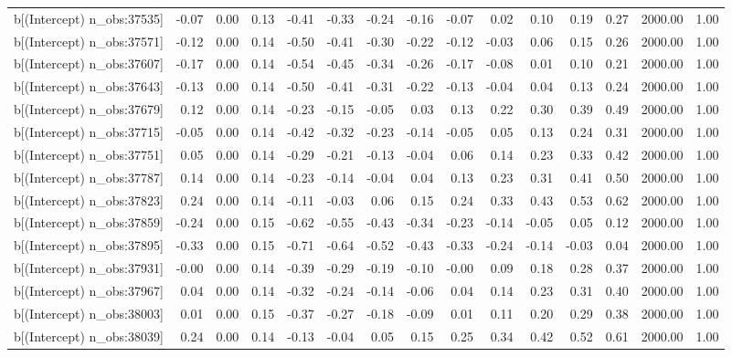 \begin{table}[ht]
\begin{tabular}{rrrrrrrrrrrrrrr}
  b[(Intercept) n\_obs:37535] & -0.07 & 0.00 & 0.13 & -0.41 & -0.33 & -0.24 & -0.16 & -0.07 & 0.02 & 0.10 & 0.19 & 0.27 & 2000.00 & 1.00 \\ 
  b[(Intercept) n\_obs:37571] & -0.12 & 0.00 & 0.14 & -0.50 & -0.41 & -0.30 & -0.22 & -0.12 & -0.03 & 0.06 & 0.15 & 0.26 & 2000.00 & 1.00 \\ 
  b[(Intercept) n\_obs:37607] & -0.17 & 0.00 & 0.14 & -0.54 & -0.45 & -0.34 & -0.26 & -0.17 & -0.08 & 0.01 & 0.10 & 0.21 & 2000.00 & 1.00 \\ 
  b[(Intercept) n\_obs:37643] & -0.13 & 0.00 & 0.14 & -0.50 & -0.41 & -0.31 & -0.22 & -0.13 & -0.04 & 0.04 & 0.13 & 0.24 & 2000.00 & 1.00 \\ 
  b[(Intercept) n\_obs:37679] & 0.12 & 0.00 & 0.14 & -0.23 & -0.15 & -0.05 & 0.03 & 0.13 & 0.22 & 0.30 & 0.39 & 0.49 & 2000.00 & 1.00 \\ 
  b[(Intercept) n\_obs:37715] & -0.05 & 0.00 & 0.14 & -0.42 & -0.32 & -0.23 & -0.14 & -0.05 & 0.05 & 0.13 & 0.24 & 0.31 & 2000.00 & 1.00 \\ 
  b[(Intercept) n\_obs:37751] & 0.05 & 0.00 & 0.14 & -0.29 & -0.21 & -0.13 & -0.04 & 0.06 & 0.14 & 0.23 & 0.33 & 0.42 & 2000.00 & 1.00 \\ 
  b[(Intercept) n\_obs:37787] & 0.14 & 0.00 & 0.14 & -0.23 & -0.14 & -0.04 & 0.04 & 0.13 & 0.23 & 0.31 & 0.41 & 0.50 & 2000.00 & 1.00 \\ 
  b[(Intercept) n\_obs:37823] & 0.24 & 0.00 & 0.14 & -0.11 & -0.03 & 0.06 & 0.15 & 0.24 & 0.33 & 0.43 & 0.53 & 0.62 & 2000.00 & 1.00 \\ 
  b[(Intercept) n\_obs:37859] & -0.24 & 0.00 & 0.15 & -0.62 & -0.55 & -0.43 & -0.34 & -0.23 & -0.14 & -0.05 & 0.05 & 0.12 & 2000.00 & 1.00 \\ 
  b[(Intercept) n\_obs:37895] & -0.33 & 0.00 & 0.15 & -0.71 & -0.64 & -0.52 & -0.43 & -0.33 & -0.24 & -0.14 & -0.03 & 0.04 & 2000.00 & 1.00 \\ 
  b[(Intercept) n\_obs:37931] & -0.00 & 0.00 & 0.14 & -0.39 & -0.29 & -0.19 & -0.10 & -0.00 & 0.09 & 0.18 & 0.28 & 0.37 & 2000.00 & 1.00 \\ 
  b[(Intercept) n\_obs:37967] & 0.04 & 0.00 & 0.14 & -0.32 & -0.24 & -0.14 & -0.06 & 0.04 & 0.14 & 0.23 & 0.31 & 0.40 & 2000.00 & 1.00 \\ 
  b[(Intercept) n\_obs:38003] & 0.01 & 0.00 & 0.15 & -0.37 & -0.27 & -0.18 & -0.09 & 0.01 & 0.11 & 0.20 & 0.29 & 0.38 & 2000.00 & 1.00 \\ 
  b[(Intercept) n\_obs:38039] & 0.24 & 0.00 & 0.14 & -0.13 & -0.04 & 0.05 & 0.15 & 0.25 & 0.34 & 0.42 & 0.52 & 0.61 & 2000.00 & 1.00 \\ 

\end{tabular}
\end{table}
